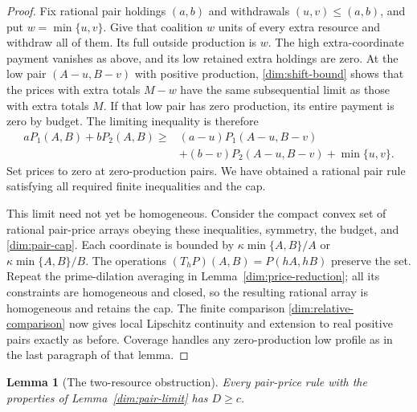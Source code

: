 \documentclass[11pt]{article}
\newtheorem{lemma}[theorem]{Lemma}
\theoremstyle{definition}\newtheorem{definition}[theorem]{Definition}
\theoremstyle{remark}\newtheorem{remark}[theorem]{Remark}
\begin{document}
\begin{proof}
Fix rational pair holdings $(a,b)$ and withdrawals $(u,v)\le(a,b)$,
and put $w=\min\{u,v\}$. Give that coalition $w$ units of every extra
resource and withdraw all of them. Its full outside production is $w$.
The high extra-coordinate payment vanishes as above, and its low retained
extra holdings are zero. At the low pair $(A-u,B-v)$ with positive
production, \eqref{dim:shift-bound} shows that the prices with extra totals
$M-w$ have the same subsequential limit as those with extra totals $M$.
If that low pair has zero production, its entire payment is zero by budget.
The limiting inequality is therefore
\begin{align*}
 aP_1(A,B)+bP_2(A,B)
 \ge{}&(a-u)P_1(A-u,B-v)\\
 &+(b-v)P_2(A-u,B-v)+\min\{u,v\}.
\end{align*}
Set prices to zero at zero-production pairs. We have obtained a rational
pair rule satisfying all required finite inequalities and the cap.

This limit need not yet be homogeneous. Consider the compact convex set
of rational pair-price arrays obeying these inequalities, symmetry, the
budget, and \eqref{dim:pair-cap}. Each coordinate is bounded by
$\kappa\min\{A,B\}/A$ or $\kappa\min\{A,B\}/B$.
The operations $(T_hP)(A,B)=P(hA,hB)$ preserve the set. Repeat the
prime-dilation averaging in Lemma~\ref{dim:price-reduction}; all its
constraints are homogeneous and closed, so the resulting rational array
is homogeneous and retains the cap. The finite comparison
\eqref{dim:relative-comparison} now gives local Lipschitz continuity and
extension to real positive pairs exactly as before. Coverage handles any
zero-production low profile as in the last paragraph of that lemma.
\end{proof}

\begin{lemma}[The two-resource obstruction]\label{dim:pair-obstruction}
Every pair-price rule with the properties of
Lemma~\ref{dim:pair-limit} has $D\ge c$.
\end{lemma}
\end{document}
